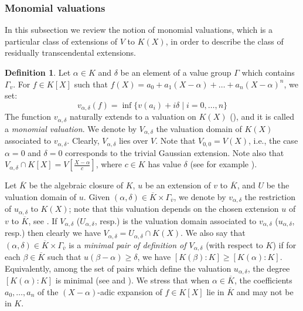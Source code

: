 \documentclass[10pt]{article}
\numberwithin{equation}{section}
\theoremstyle{definition}
\newtheorem{Def}[equation]{Definition}
\theoremstyle{definition}
\newcommand{\olK}{\overline{K}}
\begin{document}
\subsubsection{Monomial valuations}\label{monomial valuations}

In this subsection we review the notion of monomial valuations, which is a particular class of extensions of $V$ to $K(X)$, in order to describe the class of residually transcendental extensions.


\begin{Def}
Let $\alpha\in K$ and $\delta$ be an element of a value group $\Gamma$ which contains $\Gamma_v$. For $f\in K[X]$ such that $f(X)=a_0+a_1(X-\alpha)+\ldots+a_n(X-\alpha)^n$, we set:
$$v_{\alpha,\delta}(f)=\inf\{v(a_i)+i\delta \mid i=0,\ldots,n\}$$
The function $v_{\alpha,\delta}$ naturally extends to a valuation on $K(X)$ (\cite[Chapt. VI, \S. 10, Lemme 1]{Bourb}), 
and it is called a \emph{monomial valuation}. We denote by $V_{\alpha,\delta}$ the valuation domain of $K(X)$ associated to $v_{\alpha,\delta}$. 
Clearly, $V_{\alpha,\delta}$ lies over $V$.
Note that $V_{0,0} = V(X)$, i.e.,
the case $\alpha=0$ and $\delta=0$ corresponds to the trivial Gaussian extension. Note also that $V_{\alpha,\delta}\cap K[X]=V[\frac{X-\alpha}{c}]$, where $c\in K$ has value $\delta$ (see for example \cite[Remark 3.4]{PerPrufer}).
\end{Def}

Let $\overline{K}$ be the algebraic closure of $K$, 
$u$ be an extension of $v$ to $\overline{K}$, and 
$U$ be the valuation domain of $u$. Given 
$(\alpha,\delta)\in\overline{K}\times\Gamma_{\overline{v}}$, we denote by $v_{\alpha,\delta}$ the restriction of $u_{\alpha,\delta}$ to $K(X)$; note that this valuation depends on the chosen extension $u$ of $v$ to $\overline{K}$, see \cite[Remark 3.9]{PerPrufer}. If $V_{\alpha,\delta}$ ($U_{\alpha,\delta}$, resp.) is the valuation domain associated to $v_{\alpha,\delta}$ ($u_{\alpha,\delta}$, resp.) then clearly we have $V_{\alpha,\delta}=U_{\alpha,\delta}\cap K(X)$.
We also say that $(\alpha,\delta)\in\overline{K}\times\Gamma_{\overline{v}}$ is a \emph{minimal pair of definition of $V_{\alpha,\delta}$} (with respect to $K$)  if for each $\beta\in\overline{K}$ such that $u(\beta-\alpha)\geq \delta$, we have $[K(\beta):K]\geq[K(\alpha):K]$. Equivalently, among the set of pairs which define the valuation $u_{\alpha, \delta}$, the degree $[K(\alpha):K]$ is minimal (see \cite[Proposition 3]{AlePop} and \cite{APZTheorem}). We stress that when $\alpha\in\olK$, the coefficients $a_0,\ldots,a_n$ of the $(X-\alpha)$-adic expansion of $f\in K[X]$ lie in $\olK$ and may not be in $K$.
\end{document}
